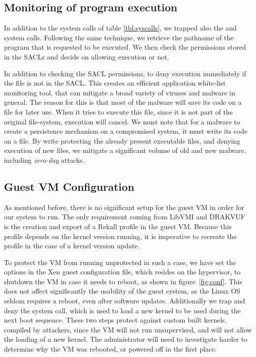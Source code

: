 \subsection{Monitoring of program execution}

\par In addition to the system calls of table \ref{tbl:syscalls}, we trapped also the  and  system calls. Following the same technique, we retrieve the pathname of the program that is requested to be executed. We then check the permissions stored in the \acp{SACL} and decide on allowing execution or not.

\par In addition to checking the \ac{SACL} permissions, to deny execution immediately if the file is not in the \ac{SACL}. This creates an efficient application white-list monitoring tool, that can mitigate a broad variety of viruses and malware in general. The reason for this is that most of the malware will save its code on a file for later use. When it tries to execute this file, since it is not part of the original file-system, execution will cancel. We must note that for a malware to create a persistence mechanism on a compromised system, it must write its code on a file. By write protecting the already present executable files, and denying execution of new files, we mitigate a significant volume of old and new malware, including \emph{zero-day} attacks.



\subsection{Guest \ac{VM} Configuration}\label{sub:conf}

As mentioned before, there is no significant setup for the guest \ac{VM} in order for our system to run. The only requirement coming from LibVMI and DRAKVUF is the creation and export of a Rekall profile in the guest \ac{VM}. Because this profile depends on the kernel version running, it is imperative to recreate the profile in the case of a kernel version update. 

\par To protect the \ac{VM} from running unprotected in such a case, we have set the options in the Xen guest configuration file, which resides on the hypervisor, to shutdown the \ac{VM} in case it needs to reboot, as shown in figure~\ref{fig:conf}. This does not affect significantly the usability of the guest system, as the Linux \ac{OS} seldom requires a reboot, even after software updates. Additionally we trap and deny the  system call, which is used to load a new kernel to be used during the next boot sequence. These two steps protect against custom built kernels, compiled by attackers, since the \ac{VM} will not run unsupervised, and will not allow the loading of a new kernel. The administrator will need to investigate harder to determine why the \ac{VM} was rebooted, or powered off in the first place.

